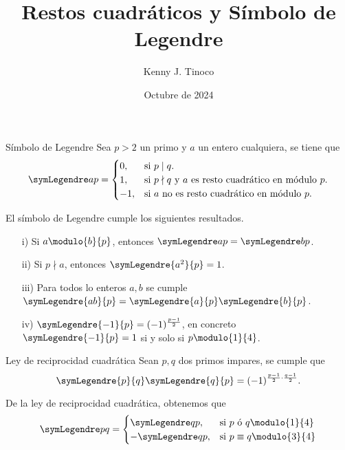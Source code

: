 \documentclass[12pt]{article}
\title{Restos cuadráticos y Símbolo de Legendre}
\author{Kenny J. Tinoco}
\date{Octubre de 2024}
\begin{document}
   \maketitle
   \begin{definition.box}{Símbolo de Legendre}{}
      Sea $p> 2$ un primo y $a$ un entero cualquiera, se tiene que
      \[
         \symLegendre a p =
         \begin{cases}
            0, &\text{si}\ p \mid q.\\
            1, &\text{si}\ p \nmid q \ \text{y}\ a \ \text{es resto cuadrático en módulo}\ p.\\
            -1,&\text{si}\ a \ \text{no es resto cuadrático en módulo}\ p.\\
         \end{cases}
      \]
   \end{definition.box}

   \begin{lemma}
      El símbolo de Legendre cumple los siguientes resultados.
      \begin{enumerate}
         \item [i)] Si $a \modulo{b}{p}$, entonces $\symLegendre a p = \symLegendre b p$.
         \item [ii)] Si $p \nmid a$, entonces $\symLegendre{a^2}{p} = 1$.
         \item [iii)] Para todos lo enteros $a,b$ se cumple $\symLegendre{ab}{p} = \symLegendre{a}{p} \symLegendre{b}{p}$.
         \item [iv)] $\symLegendre{-1}{p} = (-1)^{\frac{p - 1}{2}}$, en concreto $\symLegendre{-1}{p} = 1$ si y solo si $p \modulo{1}{4}$.
      \end{enumerate}
   \end{lemma}

   \begin{theorem.box}{Ley de reciprocidad cuadrática}{}
      Sean $p, q$ dos primos impares, se cumple que
      \[
         \symLegendre{p}{q} \symLegendre{q}{p} = (-1)^{\frac{p - 1}{2} \cdot \frac{q - 1}{2}}.
      \]
   \end{theorem.box}

   \begin{remark.box}{}{}
      De la ley de reciprocidad cuadrática, obtenemos que
      \[
         \symLegendre p q =
         \begin{cases}
            \symLegendre q p, &\text{si}\ p\ \text{ó}\ q \modulo{1}{4}\\
            - \symLegendre q p, &\text{si}\ p \equiv q \modulo{3}{4}
         \end{cases}
      \]
   \end{remark.box}
\end{document}
